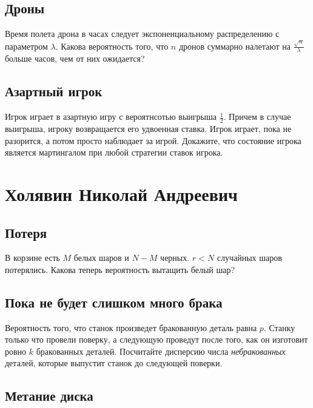 \documentclass[12pt]{article}
\begin{document}
\subsection{Дроны}

Время полета дрона в часах следует экспоненциальному распределению с параметром $\lambda$. Какова вероятность того, что $n$ дронов суммарно налетают на $\frac{\sqrt{n}}{\lambda}$ больше часов, чем от них ожидается?



\subsection{Азартный игрок}

Игрок играет в азартную игру с вероятнсотью выигрыша $\frac{1}{2}$. Причем в случае выигрыша, игроку возвращается его удвоенная ставка. Игрок играет, пока не разорится, а потом просто наблюдает за игрой. Докажите, что состояние игрока является мартингалом при любой стратегии ставок игрока.



\newpage
\section{Холявин Николай Андреевич}

\subsection{Потеря}

В корзине есть $M$ белых шаров и $N - M$ черных. $r < N$ случайных шаров потерялись. Какова теперь вероятность вытащить белый шар?



\subsection{Пока не будет слишком много брака}

Вероятность того, что станок произведет бракованную деталь равна $p$. Станку только что провели поверку, а следующую проведут после того, как он изготовит ровно $k$ бракованных деталей. Посчитайте дисперсию числа \emph{небракованных} деталей, которые выпустит станок до следующей поверки.



\subsection{Метание диска}
\end{document}
